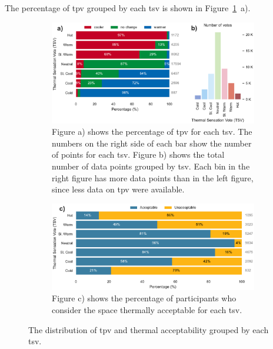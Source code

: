 The percentage of \ac{tpv} grouped by each \ac{tsv} is shown in Figure~\ref{fig:bar_plot_tp_by_ts}~a).
\begin{figure}[htb!]
    \centering
    \begin{subfigure}[b]{\textwidth}
        \centering
        \includegraphics[width=\textwidth]{figures/bar_plot_tp_by_ts}
        \caption{Figure a) shows the percentage of \ac{tpv} for each \ac{tsv}.
    The numbers on the right side of each bar show the number of points for each \ac{tsv}.
        Figure b) shows the total number of data points grouped by \ac{tsv}.
    Each bin in the right figure has more data points than in the left figure, since less data on \ac{tpv} were available.}
    \label{fig:bar_plot_tp_by_ts}
    \end{subfigure}
    \par\bigskip %
    \begin{subfigure}[b]{\textwidth}
        \centering
        \includegraphics[width=\textwidth]{figures/bar_plot_thermal_acceptability_by_thermal_sensation_round}
    \caption{
        Figure c) shows the percentage of participants who consider the space thermally acceptable for each \ac{tsv}.}
        \label{fig:thermal_acceptability_by_ts}
    \end{subfigure}
    \caption{The distribution of \ac{tpv} and thermal acceptability grouped by each \ac{tsv}.}
\end{figure}
